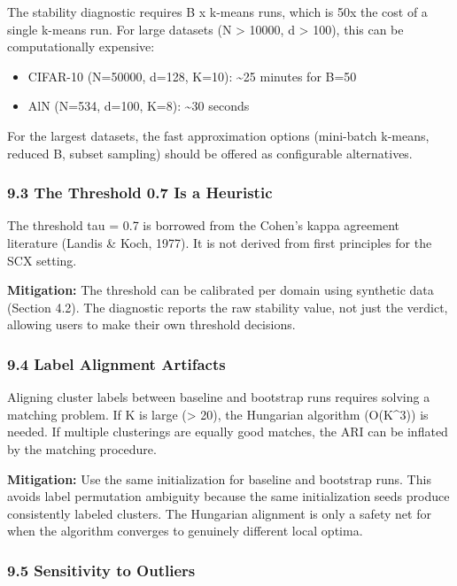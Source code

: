\documentclass[
  12pt,
]{article}
\providecommand{\tightlist}{%
  \setlength{\itemsep}{0pt}\setlength{\parskip}{0pt}}
\begin{document}
The stability diagnostic requires B x k-means runs, which is 50x the
cost of a single k-means run. For large datasets (N \textgreater{}
10000, d \textgreater{} 100), this can be computationally expensive:

\begin{itemize}
\tightlist
\item
  CIFAR-10 (N=50000, d=128, K=10): \textasciitilde25 minutes for B=50
\item
  AlN (N=534, d=100, K=8): \textasciitilde30 seconds
\end{itemize}

For the largest datasets, the fast approximation options (mini-batch
k-means, reduced B, subset sampling) should be offered as configurable
alternatives.

\subsubsection{9.3 The Threshold 0.7 Is a
Heuristic}\label{the-threshold-0.7-is-a-heuristic}

The threshold tau = 0.7 is borrowed from the Cohen's kappa agreement
literature (Landis \& Koch, 1977). It is not derived from first
principles for the SCX setting.

\textbf{Mitigation:} The threshold can be calibrated per domain using
synthetic data (Section 4.2). The diagnostic reports the raw stability
value, not just the verdict, allowing users to make their own threshold
decisions.

\subsubsection{9.4 Label Alignment
Artifacts}\label{label-alignment-artifacts}

Aligning cluster labels between baseline and bootstrap runs requires
solving a matching problem. If K is large (\textgreater{} 20), the
Hungarian algorithm (O(K\^{}3)) is needed. If multiple clusterings are
equally good matches, the ARI can be inflated by the matching procedure.

\textbf{Mitigation:} Use the same initialization for baseline and
bootstrap runs. This avoids label permutation ambiguity because the same
initialization seeds produce consistently labeled clusters. The
Hungarian alignment is only a safety net for when the algorithm
converges to genuinely different local optima.

\subsubsection{9.5 Sensitivity to
Outliers}\label{sensitivity-to-outliers}
\end{document}
